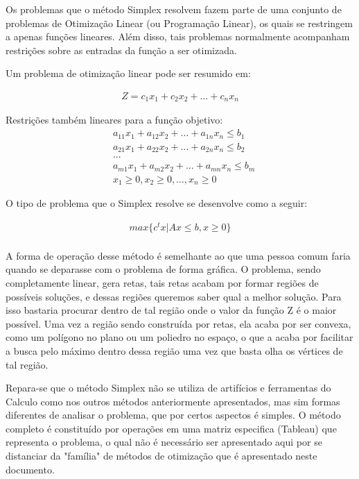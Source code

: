 Os problemas que o método Simplex resolvem fazem parte de uma conjunto de
problemas de Otimização Linear (ou Programação Linear), os quais se restringem
a apenas funções lineares. Além disso, tais problemas normalmente acompanham
restrições sobre as entradas da função a ser otimizada.

Um problema de otimização linear pode ser resumido em:

\begin{equation}
    \begin{split}
        Z = c_1x_1 + c_2x_2 + … + c_nx_n
    \end{split}
\end{equation}

Restrições também lineares para a função objetivo:
\begin{equation}
    \begin{split}
        &   a_{11}x_1 + a_{12}x_2 + … + a_{1n}x_n \leq b_1\\
        &   a_{21}x_1 + a_{22}x_2 + … + a_{2n}x_n \leq b_2\\
        &   ...\\
        &   a_{m1}x_1 + a_{m2}x_2 + … + a_{mn}x_n \leq b_m\\
        &   x_1 \geq 0, x_2 \geq 0, …, x_n \geq 0
    \end{split}
\end{equation}

O tipo de problema que o Simplex resolve se desenvolve como a seguir:

\begin{equation}
    \begin{split}
        max \{c^tx | Ax \leq b, x \geq 0\}\\
    \end{split}
\end{equation}


A forma de operação desse método é semelhante ao que uma pessoa comum faria
quando se deparasse com o problema de forma gráfica. O problema, sendo
completamente linear, gera retas, tais retas acabam por formar regiões de
possíveis soluções, e dessas regiões queremos saber qual a melhor solução.
Para isso bastaria procurar dentro de tal região onde o valor da função Z é o
maior possível. Uma vez a região sendo construída por retas, ela acaba por ser
convexa, como um polígono no plano ou um poliedro no espaço, o que a acaba por
facilitar a busca pelo máximo dentro dessa região uma vez que basta olha os
vértices de tal região.

Repara-se que o método Simplex não se utiliza de artifícios e ferramentas do
Calculo como nos outros métodos anteriormente apresentados, mas sim formas
diferentes de analisar o problema, que por certos aspectos é simples. O método
completo é constituído por operações em uma matriz especifica (Tableau) que
representa o problema, o qual não é necessário ser apresentado aqui por se
distanciar da "família" de métodos de otimização que é apresentado neste
documento.



